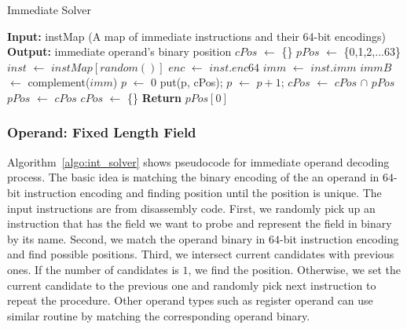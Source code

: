 \begin{algorithm}[htbp]
    \caption{Immediate Solver} %
      \label{algo:int_solver}
  \begin{algorithmic}[1]
	  \State \textbf{Input:} instMap (A map of immediate instructions and their 64-bit encodings)
      \State \textbf{Output:} immediate operand's binary position
      \State $cPos$ $\gets$ \{\} 
      \State $pPos$ $\gets$ \{0,1,2,...63\} 
      \State $inst$ $\gets$ $instMap[random()]$ 
      \State $enc$ $\gets$ $inst.enc64$ 
      \State $imm$ $\gets$ $inst.imm$ 
      \State $immB$ $\gets$ complement($imm$)
      \State $p$ $\gets$ 0
      \State put(p, cPos); $p$ $\gets$ $p+1$;
      \EndIf
      \EndWhile
      \State $cPos$ $\gets$ $cPos$ $\cap$ $pPos$
      \State $pPos$ $\gets$ $cPos$
      \State $cPos$ $\gets$ \{\}
      \EndWhile
      \State \textbf{Return} $pPos[0]$
  \end{algorithmic}
\end{algorithm}
\subsubsection{Operand: Fixed Length Field}
Algorithm~\ref{algo:int_solver} shows pseudocode for immediate operand decoding process. 
The basic idea is matching the binary encoding of the an operand in $64$-bit instruction encoding and finding
position until the position is unique. The input instructions are from disassembly code.
First, we randomly pick up an instruction that has the field we want to probe and represent the field in binary by its 
name. Second, we match the operand binary in $64$-bit instruction encoding and find possible positions. Third, we 
intersect current candidates with previous ones. If the number of candidates is $1$, we find the position. Otherwise, 
we set the current candidate to the previous one and randomly pick next instruction to repeat the procedure.
Other operand types such as register operand can use similar routine by matching the corresponding operand binary.

